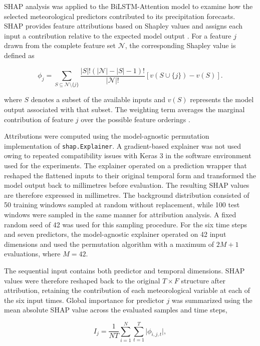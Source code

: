 \documentclass[referee,pdflatex,sn-basic]{sn-jnl}%
\theoremstyle{thmstyleone}%
\theoremstyle{thmstyletwo}%
\theoremstyle{thmstylethree}%
\begin{document}
SHAP analysis was applied to the BiLSTM-Attention model to examine how the selected meteorological predictors contributed to its precipitation forecasts. SHAP provides feature attributions based on Shapley values and assigns each input a contribution relative to the expected model output \citep{lundberg2017unified}. For a feature $j$ drawn from the complete feature set $\mathcal{N}$, the corresponding Shapley value is defined as

\begin{equation}
\label{eq:shapley}
\phi_j =
\sum_{S \subseteq \mathcal{N}\setminus\{j\}}
\frac{\lvert S\rvert!\left(\lvert\mathcal{N}\rvert-\lvert S\rvert-1\right)!}
{\lvert\mathcal{N}\rvert!}
\left[v(S\cup\{j\})-v(S)\right].
\end{equation}

where $S$ denotes a subset of the available inputs and $v(S)$ represents the model output associated with that subset. The weighting term averages the marginal contribution of feature $j$ over the possible feature orderings \citep{rozemberczki2022shapley}.

Attributions were computed using the model-agnostic permutation implementation of \texttt{shap.Explainer}. A gradient-based explainer was not used owing to repeated compatibility issues with Keras 3 in the software environment used for the experiments. The explainer operated on a prediction wrapper that reshaped the flattened inputs to their original temporal form and transformed the model output back to millimetres before evaluation. The resulting SHAP values are therefore expressed in millimetres. The background distribution consisted of 50 training windows sampled at random without replacement, while 100 test windows were sampled in the same manner for attribution analysis. A fixed random seed of 42 was used for this sampling procedure. For the six time steps and seven predictors, the model-agnostic explainer operated on 42 input dimensions and used the permutation algorithm with a maximum of $2M+1$ evaluations, where $M=42$.

The sequential input contains both predictor and temporal dimensions. SHAP values were therefore reshaped back to the original $T\times F$ structure after attribution, retaining the contribution of each meteorological variable at each of the six input times. Global importance for predictor $j$ was summarized using the mean absolute SHAP value across the evaluated samples and time steps,

\begin{equation}
I_j =
\frac{1}{NT}
\sum_{i=1}^{N}
\sum_{t=1}^{T}
\lvert
\phi_{i,j,t}
\rvert,
\label{eq:global_shap}
\end{equation}
\end{document}
